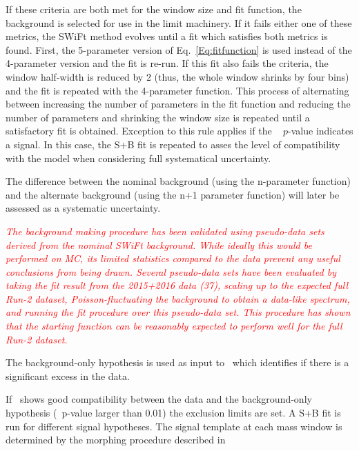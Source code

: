 If these criteria are both met for the window size and fit function, the
background is selected for use in the limit machinery.  If it fails either one
of these metrics, the SWiFt method evolves until a fit which satisfies both
metrics is found.  First, the 5-parameter version of Eq.~\ref{Eq:fitfunction} is
used instead of the 4-parameter version and the fit is re-run.  If this fit also
fails the criteria, the window half-width is reduced by 2 (thus, the whole
window shrinks by four bins) and the fit is repeated with the 4-parameter
function.  This process of alternating between increasing the number of
parameters in the fit function and reducing the number of parameters and
shrinking the window size is repeated until a satisfactory fit is obtained.
Exception to this rule applies if the \BumpHunter~ $p$-value indicates a signal.
In this case, the S+B fit is repeated to asses the level of compatibility with
the model when considering full systematical uncertainty.

The difference between the nominal background (using the n-parameter function) and the alternate background (using the n+1 parameter function) will later be assessed as a systematic uncertainty.

{\textit {\textcolor{red}{ The background making procedure has been validated using pseudo-data sets derived from the nominal SWiFt background. While ideally this would be performed on MC, its limited statistics compared to the data prevent any useful conclusions from being drawn. Several pseudo-data sets have been evaluated by taking the fit result from the 2015+2016 data (37\ifb), scaling up to the expected full Run-2 dataset, Poisson-fluctuating the background to obtain a data-like spectrum, and running the fit procedure over this pseudo-data set.  This procedure has shown that the starting function can be reasonably expected to perform well for the full Run-2 dataset.}}}


The background-only hypothesis is used as input to \BumpHunter\,  which
identifies if there is a significant excess in the data.

If \BumpHunter\ shows good compatibility between the data and the
background-only hypothesis (\BumpHunter\ p-value larger than 0.01) the exclusion
limits are set. A S+B fit is run for different signal hypotheses. The signal template at each mass window
is determined by the morphing procedure described in

